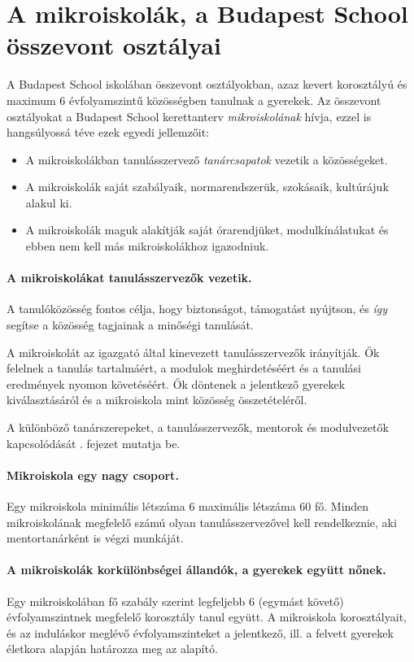 \section{A mikroiskolák, a Budapest School összevont osztályai}
\label{sec:mikroiskola}

A Budapest School iskolában összevont osztályokban, azaz kevert korosztályú és
maximum 6 évfolyamszintű közösségben tanulnak a gyerekek. Az összevont
osztályokat a Budapest School kerettanterv \emph{mikroiskolának} hívja, ezzel
is
hangsúlyossá téve ezek egyedi jellemzőit:
\begin{itemize}
      \item A mikroiskolákban  tanulásszervező  \emph{tanárcsapatok} vezetik a
            közösségeket. 
      \item A mikroiskolák saját szabályaik, normarendszerük, szokásaik,
            kultúrájuk alakul ki.
      \item A mikroiskolák maguk alakítják saját órarendjüket, modulkínálatukat
            és ebben nem kell más mikroiskolákhoz igazodniuk.
\end{itemize}


\paragraph{A mikroiskolákat tanulásszervezők vezetik.}

A tanulóközösség fontos célja, hogy biztonságot, támogatást nyújtson, és
\emph{így} segítse a közösség tagjainak a minőségi tanulását.

A mikroiskolát az igazgató által kinevezett tanulásszervezők irányítják.
Ők felelnek a tanulás tartalmáért, a modulok meghirdetéséért és a
tanulási eredmények nyomon követéséért. Ők döntenek a jelentkező gyerekek
kiválasztásáról és a mikroiskola mint közösség összetételéről.

A különböző tanárszerepeket, a tanulásszervezők, mentorok és modulvezetők kapcsolódását . fejezet mutatja be.

\paragraph{Mikroiskola egy nagy csoport.}

Egy mikroiskola minimális létszáma 6 maximális létszáma 60 fő. Minden
mikroiskolának megfelelő számú olyan tanulásszervezővel kell
rendelkeznie, aki mentortanárként is végzi munkáját.

\paragraph{A mikroiskolák korkülönbségei állandók, a gyerekek együtt nőnek.}
Egy mikroiskolában fő szabály szerint legfeljebb 6 (egymást követő)
évfolyamszintnek megfelelő korosztály tanul együtt. A mikroiskola
korosztályait, és az induláskor meglévő évfolyamszinteket a jelentkező, ill. a
felvett gyerekek életkora alapján határozza meg az alapító.

